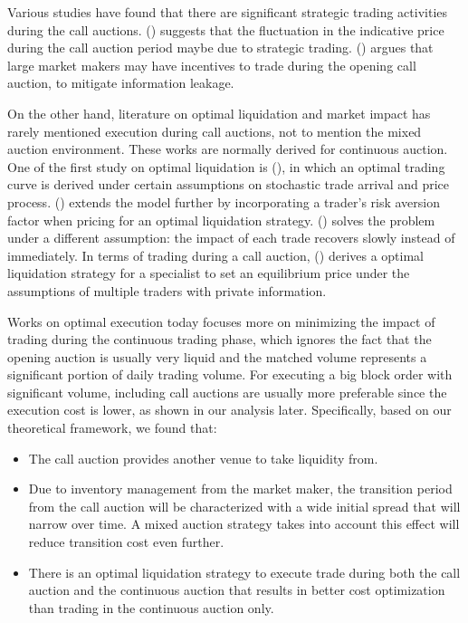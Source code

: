 Various studies have found that there are significant strategic trading activities during the call auctions. (\cite{Bruno1999}) suggests that the fluctuation in the indicative price during the call auction period maybe due to strategic trading. (\cite{Vives2001}) argues that large market makers may have incentives to trade during the opening call auction, to mitigate information leakage.

On the other hand, literature on optimal liquidation and market impact has rarely mentioned execution during call auctions, not to mention the mixed auction environment. These works are normally derived for continuous auction. One of the first study on optimal liquidation is (\cite{Ho1981}), in which an optimal trading curve is derived under certain assumptions on stochastic trade arrival and price process. (\cite{Almgren2000}) extends the model further by incorporating a trader's risk aversion factor when pricing for an optimal liquidation strategy. (\cite{Obizhaeva2013}) solves the problem under a different assumption: the impact of each trade recovers slowly instead of immediately. In terms of trading during a call auction, (\cite{Madhavan2015}) derives a optimal liquidation strategy for a specialist to set an equilibrium price under the assumptions of multiple traders with private information.

Works on optimal execution today focuses more on minimizing the impact of trading during the continuous trading phase, which ignores the fact that the opening auction is usually very liquid and the matched volume represents a significant portion of daily trading volume. For executing a big block order with significant volume, including call auctions are usually more preferable since the execution cost is lower, as shown in our analysis later. Specifically, based on our theoretical framework, we found that:

\begin{itemize}
  \item The call auction provides another venue to take liquidity from.
  \item Due to inventory management from the market maker, the transition period from the call auction will be characterized with a wide initial spread that will narrow over time. A mixed auction strategy takes into account this effect will reduce transition cost even further.
  \item There is an optimal liquidation strategy to execute trade during both the call auction and the continuous auction that results in better cost optimization than trading in the continuous auction only.
\end{itemize}

